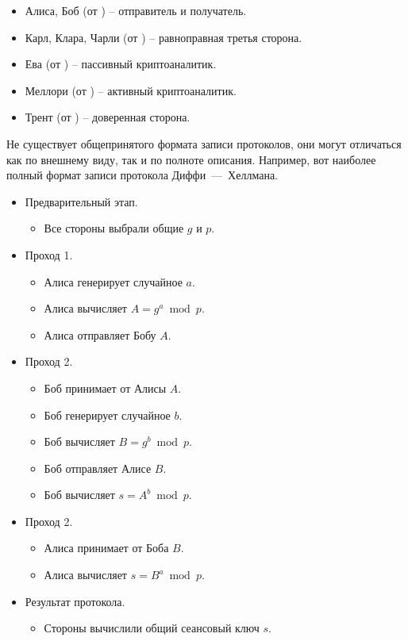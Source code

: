 \begin{itemize}
	\item Алиса, Боб (от ) -- отправитель и получатель.
	\item Карл, Клара, Чарли (от ) -- равноправная третья сторона.
	\item Ева (от ) -- пассивный криптоаналитик.
	\item Меллори (от ) -- активный криптоаналитик.
	\item Трент (от ) -- доверенная сторона.
\end{itemize}

Не существует общепринятого формата записи протоколов, они могут отличаться как по внешнему виду, так и по полноте описания. Например, вот наиболее полный формат записи протокола Диффи~---~Хеллмана.

\begin{itemize}
	\item Предварительный этап.
	\begin{itemize}
		\item Все стороны выбрали общие $g$ и $p$.
	\end{itemize}
	\item Проход 1.
	\begin{itemize}
		\item Алиса генерирует случайное $a$.
		\item Алиса вычисляет $A = g^a \bmod p$.
		\item Алиса отправляет Бобу $A$.
	\end{itemize}
	\item Проход 2.
	\begin{itemize}
		\item Боб принимает от Алисы $A$.
		\item Боб генерирует случайное $b$.
		\item Боб вычисляет $B = g^b \bmod p$.
		\item Боб отправляет Алисе $B$.
		\item Боб вычисляет $s = A^b \bmod p$.
	\end{itemize}
	\item Проход 2.
	\begin{itemize}
		\item Алиса принимает от Боба $B$.
		\item Алиса вычисляет $s = B^a \bmod p$.
	\end{itemize}
	\item Результат протокола.
	\begin{itemize}
		\item Стороны вычислили общий сеансовый ключ $s$.
	\end{itemize}
\end{itemize}

